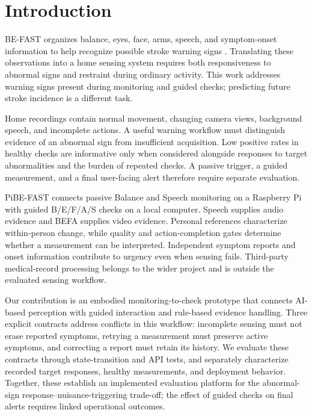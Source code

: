 \section{Introduction}
BE-FAST organizes balance, eyes, face, arms, speech, and symptom-onset information to help recognize possible stroke warning signs \cite{aroor2017befast}. Translating these observations into a home sensing system requires both responsiveness to abnormal signs and restraint during ordinary activity. This work addresses warning signs present during monitoring and guided checks; predicting future stroke incidence is a different task.

Home recordings contain normal movement, changing camera views, background speech, and incomplete actions. A useful warning workflow must distinguish evidence of an abnormal sign from insufficient acquisition. Low positive rates in healthy checks are informative only when considered alongside responses to target abnormalities and the burden of repeated checks. A passive trigger, a guided measurement, and a final user-facing alert therefore require separate evaluation.

PiBE-FAST connects passive Balance and Speech monitoring on a Raspberry Pi with guided B/E/F/A/S checks on a local computer. Speech supplies audio evidence and BEFA supplies video evidence. Personal references characterize within-person change, while quality and action-completion gates determine whether a measurement can be interpreted. Independent symptom reports and onset information contribute to urgency even when sensing fails. Third-party medical-record processing belongs to the wider project and is outside the evaluated sensing workflow.

Our contribution is an embodied monitoring-to-check prototype that connects
AI-based perception with guided interaction and rule-based evidence handling.
Three explicit contracts address conflicts in this workflow: incomplete sensing
must not erase reported symptoms, retrying a measurement must preserve active
symptoms, and correcting a report must retain its history. We evaluate these
contracts through state-transition and API tests, and separately characterize
recorded target responses, healthy measurements, and deployment behavior.
Together, these establish an implemented evaluation platform for the abnormal-sign
response--nuisance-triggering trade-off; the effect of guided checks on final
alerts requires linked operational outcomes.
